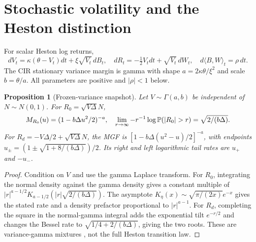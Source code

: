 \documentclass[11pt]{article}
\newtheorem{proposition}[theorem]{Proposition}
\theoremstyle{definition}\newtheorem{definition}[theorem]{Definition}
\theoremstyle{remark}\newtheorem{remark}[theorem]{Remark}
\begin{document}
\section{Stochastic volatility and the Heston distinction}\label{sec:heston}
For scalar Heston log returns,
\begin{equation}\label{eq:heston}
dV_t=\kappa(\theta-V_t)dt+\xi\sqrt{V_t}\,dB_t,\quad
dR_t=-\tfrac12V_tdt+\sqrt{V_t}\,dW_t,\quad d\langle B,W\rangle_t=\rho\,dt.
\end{equation}
The CIR stationary variance margin is gamma with shape $a=2\kappa\theta/\xi^2$ and scale $b=\theta/a$. All parameters are positive and $|\rho|<1$ below.

\begin{proposition}[Frozen-variance snapshot]\label{prop:frozen}
Let $V\sim\Gamma(a,b)$ be independent of $N\sim N(0,1)$. For $R_0=\sqrt{V\Delta}N$,
\begin{equation}
M_{R_0}(u)=(1-b\Delta u^2/2)^{-a},\quad
\lim_{r\to\infty}-r^{-1}\log\Prob(|R_0|>r)=\sqrt{2/(b\Delta)}.
\end{equation}
For $R_d=-V\Delta/2+\sqrt{V\Delta}N$, the MGF is $[1-b\Delta(u^2-u)/2]^{-a}$, with endpoints
$u_\pm=(1\pm\sqrt{1+8/(b\Delta)})/2$. Its right and left logarithmic tail rates are $u_+$ and $-u_-$.
\end{proposition}
\begin{proof}
Condition on $V$ and use the gamma Laplace transform. For $R_0$, integrating the normal density against the gamma density gives a constant multiple of
$|r|^{a-1/2}K_{a-1/2}(|r|\sqrt{2/(b\Delta)})$.
The asymptote $K_\eta(x)\sim\sqrt{\pi/(2x)}e^{-x}$ gives the stated rate and a density prefactor proportional to $|r|^{a-1}$. For $R_d$, completing the square in the normal-gamma integral adds the exponential tilt $e^{-r/2}$ and changes the Bessel rate to $\sqrt{1/4+2/(b\Delta)}$, giving the two roots. These are variance-gamma mixtures \citep{madan1990vg}, not the full Heston transition law.
\end{proof}
\end{document}
